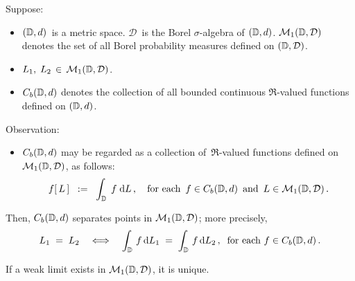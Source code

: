 \begin{theorem}
\mbox{}\vskip 0.1cm
\noindent
Suppose:
\begin{itemize}
\item
	$(\mathbb{D},d)$\, is a metric space.
	$\mathcal{D}$\, is the Borel $\sigma$-algebra of $(\mathbb{D},d)$.
	$\mathcal{M}_{1}(\mathbb{D},\mathcal{D})$ denotes the set of all Borel probability measures defined on $(\mathbb{D},\mathcal{D})$.
\item
	$L_{1},\; L_{2} \,\in\, \mathcal{M}_{1}(\mathbb{D},\mathcal{D})$.
\item
	$C_{b}(\mathbb{D},d)$ denotes the collection of all bounded continuous $\Re$-valued functions defined on $(\mathbb{D},d)$.
\end{itemize}
Observation:
\begin{itemize}
\item
	$C_{b}(\mathbb{D},d)$ may be regarded as a collection of \,$\Re$-valued functions
	defined on $\mathcal{M}_{1}(\mathbb{D},\mathcal{D})$, as follows:
	\begin{equation*}
	f\!\left[\,L\,\right]
	\;\; := \;\;
		\int_{\mathbb{D}}\; f\;\textnormal{d} L\,,
	\quad
	\textnormal{for each \,$f \in C_{b}(\mathbb{D},d)$\, and \,$L \in \mathcal{M}_{1}(\mathbb{D},\mathcal{D})$}\,.
	\end{equation*}
\end{itemize}
Then, $C_{b}(\mathbb{D},d)$ separates points in $\mathcal{M}_{1}(\mathbb{D},\mathcal{D})$;
more precisely,
\begin{equation*}
L_{1} \; = \; L_{2}
\quad\Longleftrightarrow\quad
	\int_{\mathbb{D}}\, f \,\textnormal{d} L_{1} \;=\; \int_{\mathbb{D}}\, f \,\textnormal{d} L_{2}\,,
	\;\;
	\textnormal{for each $f \in C_{b}(\mathbb{D},d)$}\,.
\end{equation*}
\end{theorem}

\begin{corollary}\quad
If a weak limit exists in $\mathcal{M}_{1}(\mathbb{D},\mathcal{D})$, it is unique.
\end{corollary}


\renewcommand{\theenumi}{\roman{enumi}}
\renewcommand{\labelenumi}{\textnormal{(\theenumi)}$\;\;$}

